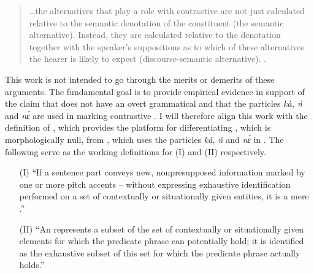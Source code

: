 \documentclass[output=paper,modfonts,nonflat,
 hidelinks
]{langsci/langscibook}
\begin{document}
\begin{quote}
…the alternatives that play a role with contrastive  are not just calculated relative to the semantic denotation of the  constituent (the semantic alternative). Instead, they are calculated relative to the  denotation together with the speaker’s suppositions as to which of these alternatives the hearer is likely to expect (discourse-semantic alternative). \citep[3]{Zimmermann2008}. 
\end{quote}

This work is not intended to go through the merits or demerits of these arguments. The fundamental goal is to provide empirical evidence in support of the claim that  does not have an overt grammatical  and that the particles \textit{kà, ń} and \textit{nɛ́} are used in marking contrastive . I will therefore align this work with the definition of \citet{ÉKiss1998}, which provides the platform for differentiating , which is morphologically null, from , which uses the particles \textit{kà, ń} and \textit{nɛ́} in . The following serve as the working definitions for (I)  and (II)  respectively. 

\begin{enumerate}
	\item[(I)]  ``If a sentence part conveys new, nonpresupposed information marked by one or more pitch accents – without expressing exhaustive identification performed on a set of contextually or situationally given entities, it is a mere .”  \citep[246]{ÉKiss1998}
 

 
	\item[(II)]  ``An  represents a subset of the set of contextually or situationally given elements for which the predicate phrase can potentially hold; it is identified as the exhaustive subset of this set for which the predicate phrase actually holds.” \citep[249]{ÉKiss1998}
\end{enumerate}  
\end{document}
